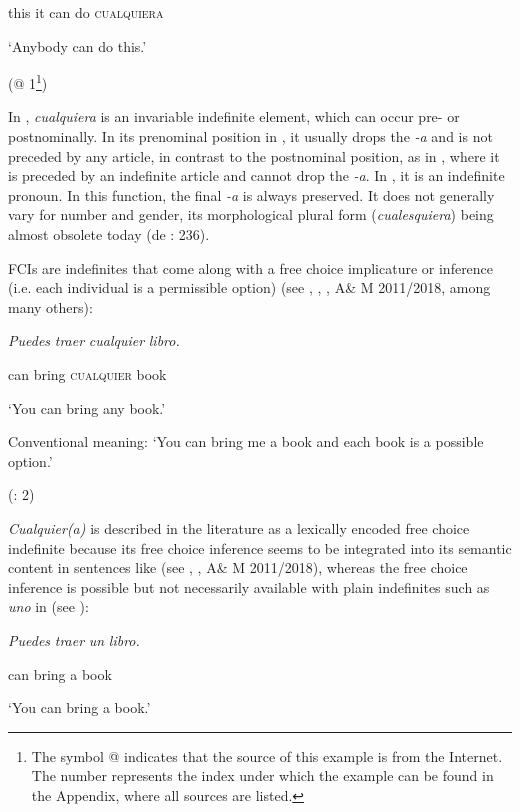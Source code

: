     this  it  can  do  \textsc{cualquiera}  

    ‘Anybody can do this.’

    (@ 1\footnote{{The symbol @ indicates that the source of this example is from the Internet. The number represents the index under which the example can be found in the Appendix, where all sources are listed.}})

In , \textit{cualquiera} is an invariable indefinite element, which can occur pre- or postnominally. In its prenominal position in , it usually drops the \textit{{}-a} and is not preceded by any article, in contrast to the postnominal position, as in , where it is preceded by an indefinite article and cannot drop the \textit{{}-a}. In , it is an indefinite pronoun. In this function, the final \textit{{}-a} is always preserved. It does not generally vary for number and gender, its morphological plural form (\textit{cualesquiera}) being almost obsolete today (de \citealt{Bruyne2011}: 236).

FCIs are indefinites that come along with a free choice implicature or inference (i.e. each individual is a permissible option) (see \citealt{Arregui2006}, \citealt{AloniPort2013}, \citealt{Aloni2021}, A\& M 2011/2018, among many others): 

    \textit{Puedes}  \textit{traer}  \textit{cualquier}  \textit{libro.}    

    can  bring  \textsc{cualquier}  book    

    ‘You can bring any book.’

    Conventional meaning: ‘You can bring me a book and each book is a possible option.’

    (\citealt{AloniEtAl2011}: 2)

\textit{Cualquier(a)} is described in the literature as a lexically encoded free choice indefinite because its free choice inference seems to be integrated into its semantic content in sentences like  (see \citealt{AloniPort2013}, \citealt{Aloni2021}, A\& M 2011/2018), whereas the free choice inference is possible but not necessarily available with plain indefinites such as \textit{uno} in  (see \citealt{Aloni2021}):

    \textit{Puedes}  \textit{traer}  \textit{un}  \textit{libro.}    

    can  bring  a  book    

    ‘You can bring a book.’

